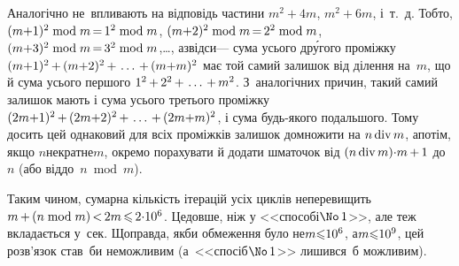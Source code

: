 Аналогічно не~впливають на відповідь частини  ${m^2{+}4m}$,  ${m^2{+}6m}$, і~т.~д. Тобто, 
${(m{+}1)^2\bmod m}\dib{{=}}{1^2\bmod m}$,
${(m{+}2)^2\bmod m}\dib{{=}}{2^2\bmod m}$,
${(m{+}3)^2\bmod m}\dib{{=}}{3^2\bmod m}$,\nolinebreak[3] \dots, 
а\nolinebreak[2] звідси\nolinebreak[3] --- сума усього др\'{у}гого проміжку $(m{+}1)^2\dib{{+}}(m{+}2)^2\dib{{+}}\dots\dib{{+}}(m{+}m)^2$ має той самий залишок від ділення на~$m$, що й сума усього першого $1^2\dib{{+}}2^2\dib{{+}}\dots\dib{{+}}m^2$. 
З~аналогічних причин, такий самий залишок %
мають і сума усього третього проміжку $(2m{+}1)^2\dib{{+}}(2m{+}2)^2\dib{{+}}\dots\dib{{+}}(2m{+}m)^2$, і сума будь-якого подальшого. Тому досить цей однаковий для всіх проміжків залишок домножити на ${n\mathop{\rm div}\nolimits m}$, а\nolinebreak[3] потім, якщо %
$n$\nolinebreak[2] не\nolinebreak[3] кратне\nolinebreak[3] $m$, окремо порахувати й додати шматочок від ${(n\bdiv m){\cdot}m}\dib{{+}}1$ до~$n$ (або від\nolinebreak[2] до~$n\bmod m$). 

Таким чином, сумарна кількість ітерацій усіх циклів не\nolinebreak[3] перевищить $m\dib{{+}}(n\bmod m)\dib{{<}}2m\dib{{\<}}{2{\cdot}10^6}$. Це\nolinebreak[3] довше, ніж у <<способі\nolinebreak[3] $\No\,1$>>, але теж вкладається у~сек. Щоправда, якби обмеження було не\nolinebreak[3] ${m{\leqslant}10^6}$, а\nolinebreak[2] ${m{\leqslant}10^9}$, цей розв'язок став~би неможливим (а~<<спосіб\nolinebreak[3] $\No\,1$>> лишився~б можливим).

